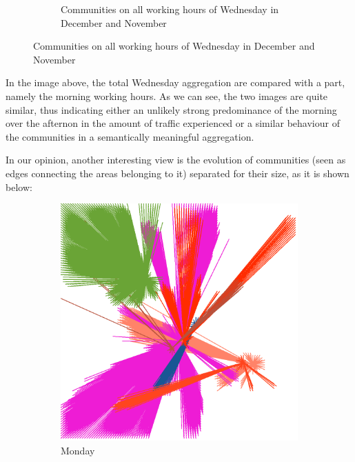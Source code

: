 \documentclass[12pt,a4paper]{article}
\begin{document}
\begin{figure}[H]
\begin{subfigure}[b]{0.48\textwidth}
\caption{Communities on all working hours of Wednesday in December and November}
\end{subfigure}
\end{figure}

In the image above, the total Wednesday aggregation are compared with a part, namely the morning working hours.
As we can see, the two images are quite similar, thus indicating either an unlikely strong predominance of the morning over the afternon in the amount of traffic experienced or a similar behaviour of the communities in a semantically meaningful aggregation.

In our opinion, another interesting view is the evolution of communities (seen as edges connecting the areas belonging to it) separated for their size, as it is shown below:

\begin{figure}[H]
\centering
\begin{subfigure}[b]{0.48\textwidth}
\includegraphics[width=\textwidth]{weekDef/edges-1Mon-big.png}
\caption{Monday}
\end{subfigure}
\begin{subfigure}[b]{0.48\textwidth}

\end{subfigure}
\end{figure}
\end{document}
